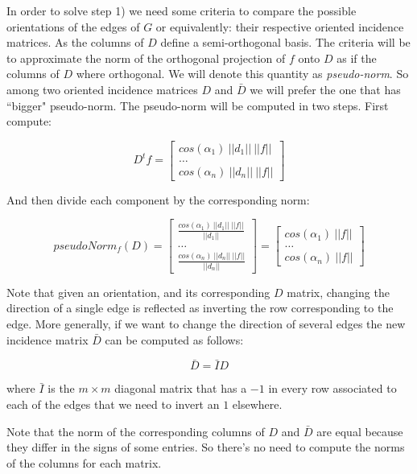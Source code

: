 \documentclass[a4paper,11pt]{article}
\begin{document}
\bigskip

In order to solve step 1) we need some criteria to compare the possible 
orientations of the edges of $G$ or equivalently: their respective 
oriented incidence matrices. As the columns of $D$ define a 
semi-orthogonal basis. The criteria will be to approximate the norm 
of the orthogonal projection of $f$ onto $D$ as if the columns of $D$ 
where orthogonal. We will denote this quantity as \textit{pseudo-norm}.
 So among two oriented incidence matrices $D$ and $\bar{D}$ we will 
prefer the one that has ``bigger" pseudo-norm. The pseudo-norm will be 
computed in two steps. First compute:

$$
D^t f = \begin{bmatrix}
	cos(\alpha_1) \ ||d_1|| \ ||f||\\
	\dots \\
	cos(\alpha_n) \ ||d_n|| \ ||f||
\end{bmatrix}
$$

\bigskip

And then divide each component by the corresponding norm:

$$
pseudoNorm_f(D) = \begin{bmatrix}
	\frac{cos(\alpha_1) \ ||d_1|| \ ||f||}{||d_1||}\\
	\dots \\
	\frac{cos(\alpha_n) \ ||d_n|| \ ||f||}{||d_n||}
\end{bmatrix} = \begin{bmatrix}
	cos(\alpha_1) \ ||f||\\
	\dots \\
	cos(\alpha_n) \ ||f||
\end{bmatrix}
$$

\bigskip


Note that given an orientation, and its 
corresponding $D$ matrix, changing the direction of a single edge is 
reflected as inverting the row corresponding to the edge. More generally, 
if we want to change the direction of several edges the new incidence 
matrix $\bar{D}$ can be computed as follows:

$$\bar{D} = \bar{I} D$$

\bigskip

where $\bar{I}$ is the $m \times m$ diagonal matrix that has a $-1$ in 
every row associated to each of the edges that we need to invert an $1$ 
elsewhere.

\bigskip


Note that the norm of the corresponding columns of $D$ and $\bar{D}$ are  
equal because they differ in the signs of some entries. So there's no 
need to compute the norms of the columns for each matrix. 
\end{document}
